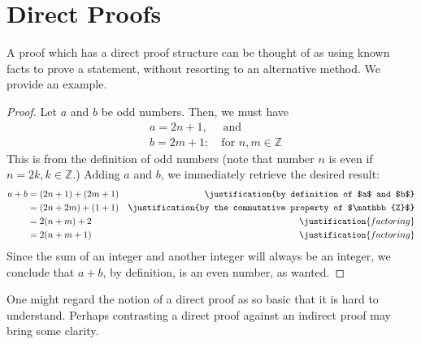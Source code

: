 \chapter{Direct Proofs}
  A proof which has a direct proof structure can be thought of as using known facts to prove a statement, without resorting to an alternative method. We provide an example. \\

\noindent {}
\begin{proof}
  Let $a$ and $b$ be odd numbers. Then, we must have
  \begin{align*}
    &a = 2n + 1, \quad \text{ and}   \\
    &b = 2m + 1; \quad \text{for } n,m \in \mathbb{Z}
  \end{align*}
  This is from the definition of odd numbers (note that number $n$ is even if $n = 2k, k \in \mathbb{Z}$.) Adding $a$ and $b$, we immediately retrieve the desired result:
  \begin{align*}
    a + b &= (2n + 1) + (2m + 1) 	& \justification{by definition of $a$ and $b$} \\
         &= (2n + 2m) + (1 + 1) 	& \justification{by the commutative property of $\mathbb{Z}$} \\
         &= 2(n+m) + 2			& \justification{factoring} \\
         &= 2(n+m+1)				& \justification{factoring}
  \end{align*}
  Since the sum of an integer and another integer will always be an integer, we conclude that $a+b$, by definition, is an even number, as wanted.
\end{proof}
One might regard the notion of a direct proof as so basic that it is hard to understand. Perhaps contrasting a direct proof against an indirect proof may bring some clarity.
